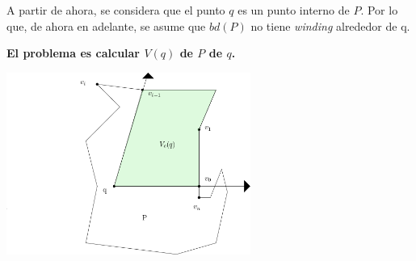 \documentclass[aspectratio=169,xcolor=dvipsnames, t]{beamer}
\begin{document}

\begin{frame}[c]
    A partir de ahora, se considera que el punto $q$ es un punto interno de $P$. Por lo que, de ahora en adelante, se asume que $bd(P)$ no tiene \textit{winding} alrededor de q.
    \vspace{0.5cm}
    \begin{center}
        \textbf{El problema es calcular $V(q)$ de $P$ de $q$.}
    \end{center}
\end{frame}




\begin{frame}
  \centering
    \includegraphics[width=0.6\textwidth]{imagenes/Caso2.4a.png}
\end{frame}

\end{document}
